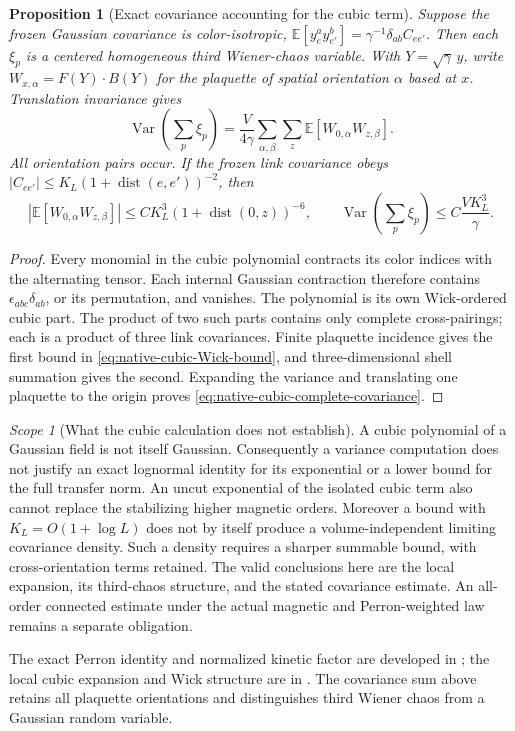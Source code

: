 \documentclass[11pt,oneside,openany]{book}
\newtheorem{proposition}[proposition]{Proposition}
\theoremstyle{definition}
\theoremstyle{remark}
\newtheorem{scope}[scope]{Scope}
\newcommand{\src}[2]{\cite[#2]{#1}}
\newcommand{\sourcebasis}[1]{\par\smallskip\noindent #1\par}
\begin{document}
\begin{proposition}[Exact covariance accounting for the cubic term]
\label{prop:native-cubic-Wick}
Suppose the frozen Gaussian covariance is color-isotropic,
$\mathbb E[y_e^a y_{e'}^b]=\gamma^{-1}\delta_{ab}C_{ee'}$.
Then each $\xi_p$ is a centered homogeneous third Wiener-chaos
variable. With $Y=\sqrt\gamma\,y$, write
$W_{x,\alpha}=F(Y)\cdot B(Y)$ for the plaquette of spatial
orientation $\alpha$ based at $x$. Translation invariance gives
\begin{equation}
 \operatorname{Var}\left(\sum_p\xi_p\right)
   =\frac{V}{4\gamma}
      \sum_{\alpha,\beta}\sum_z
       \mathbb E[W_{0,\alpha}W_{z,\beta}].
 \label{eq:native-cubic-complete-covariance}
\end{equation}
All orientation pairs occur. If the frozen link covariance obeys
$|C_{ee'}|\le K_L(1+\operatorname{dist}(e,e'))^{-2}$, then
\begin{equation}
 \left|\mathbb E[W_{0,\alpha}W_{z,\beta}]\right|
       \le C K_L^3(1+\operatorname{dist}(0,z))^{-6},
 \qquad
 \operatorname{Var}\left(\sum_p\xi_p\right)
       \le C\frac{VK_L^3}{\gamma}.
 \label{eq:native-cubic-Wick-bound}
\end{equation}
\end{proposition}
\begin{proof}
Every monomial in the cubic polynomial contracts its color indices
with the alternating tensor. Each internal Gaussian contraction
therefore contains $\epsilon_{abc}\delta_{ab}$, or its permutation,
and vanishes. The polynomial is its own Wick-ordered cubic part.
The product of two such parts contains only complete cross-pairings;
each is a product of three link covariances. Finite plaquette incidence
gives the first bound in \cref{eq:native-cubic-Wick-bound}, and
three-dimensional shell summation gives the second. Expanding the
variance and translating one plaquette to the origin proves
\cref{eq:native-cubic-complete-covariance}.
\end{proof}

\begin{scope}[What the cubic calculation does not establish]
A cubic polynomial of a Gaussian field is not itself Gaussian.
Consequently a variance computation does not justify an exact
lognormal identity for its exponential or a lower bound for the full
transfer norm. An uncut exponential of the isolated cubic term also
cannot replace the stabilizing higher magnetic orders. Moreover a
bound with $K_L=O(1+\log L)$ does not by itself produce a
volume-independent limiting covariance density. Such a density
requires a sharper summable bound, with cross-orientation terms
retained. The valid conclusions here are the local expansion,
its third-chaos structure, and the stated covariance estimate.
An all-order connected estimate under the actual magnetic and
Perron-weighted law remains a separate obligation.
\end{scope}
\sourcebasis{The exact Perron identity and normalized kinetic
factor are developed in \src{F16}{V65--V66}; the local cubic
expansion and Wick structure are in \src{F16}{V67}. The covariance
sum above retains all plaquette orientations and distinguishes
third Wiener chaos from a Gaussian random variable.}
\end{document}
